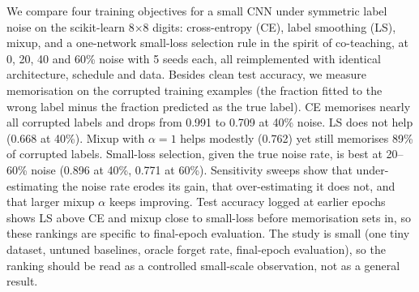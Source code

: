 We compare four training objectives for a small CNN under symmetric label noise on the scikit-learn 8$\times$8 digits: cross-entropy (CE), label smoothing (LS), mixup, and a one-network small-loss selection rule in the spirit of co-teaching, at 0, 20, 40 and 60\% noise with 5 seeds each, all reimplemented with identical architecture, schedule and data. Besides clean test accuracy, we measure memorisation on the corrupted training examples (the fraction fitted to the wrong label minus the fraction predicted as the true label). CE memorises nearly all corrupted labels and drops from 0.991 to 0.709 at 40\% noise. LS does not help (0.668 at 40\%). Mixup with $\alpha{=}1$ helps modestly (0.762) yet still memorises 89\% of corrupted labels. Small-loss selection, given the true noise rate, is best at 20--60\% noise (0.896 at 40\%, 0.771 at 60\%). Sensitivity sweeps show that under-estimating the noise rate erodes its gain, that over-estimating it does not, and that larger mixup $\alpha$ keeps improving. Test accuracy logged at earlier epochs shows LS above CE and mixup close to small-loss before memorisation sets in, so these rankings are specific to final-epoch evaluation. The study is small (one tiny dataset, untuned baselines, oracle forget rate, final-epoch evaluation), so the ranking should be read as a controlled small-scale observation, not as a general result.
